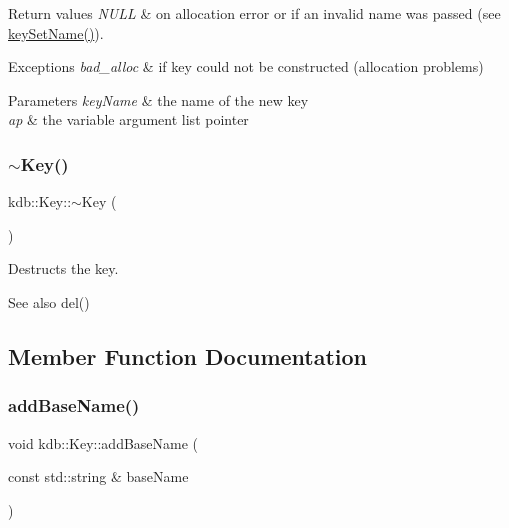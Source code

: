 \begin{DoxyRetVals}{Return values}
{\em N\+U\+LL} & on allocation error or if an invalid {\ttfamily name} was passed (see \hyperlink{group__keyname_ga7699091610e7f3f43d2949514a4b35d9}{key\+Set\+Name()}).\\
\hline
\end{DoxyRetVals}

\begin{DoxyExceptions}{Exceptions}
{\em bad\+\_\+alloc} & if key could not be constructed (allocation problems)\\
\hline
\end{DoxyExceptions}

\begin{DoxyParams}{Parameters}
{\em key\+Name} & the name of the new key \\
\hline
{\em ap} & the variable argument list pointer \\
\hline
\end{DoxyParams}
\mbox{\label{classkdb_1_1Key_a35dd6ae58d125a298e30aed13b15c1f4}} 
\subsubsection{\texorpdfstring{$\sim$\+Key()}{~Key()}}
{\footnotesize\ttfamily kdb\+::\+Key\+::$\sim$\+Key (\begin{DoxyParamCaption}{ }\end{DoxyParamCaption})\hspace{0.3cm}{\ttfamily [inline]}}



Destructs the key. 

\begin{DoxySeeAlso}{See also}
del() 
\end{DoxySeeAlso}


\subsection{Member Function Documentation}
\mbox{\label{classkdb_1_1Key_ad2f72ce0985413ce588dc33a575ea306}} 
\subsubsection{\texorpdfstring{add\+Base\+Name()}{addBaseName()}}
{\footnotesize\ttfamily void kdb\+::\+Key\+::add\+Base\+Name (\begin{DoxyParamCaption}\item[{const std\+::string \&}]{base\+Name }\end{DoxyParamCaption})\hspace{0.3cm}{\ttfamily [inline]}}



